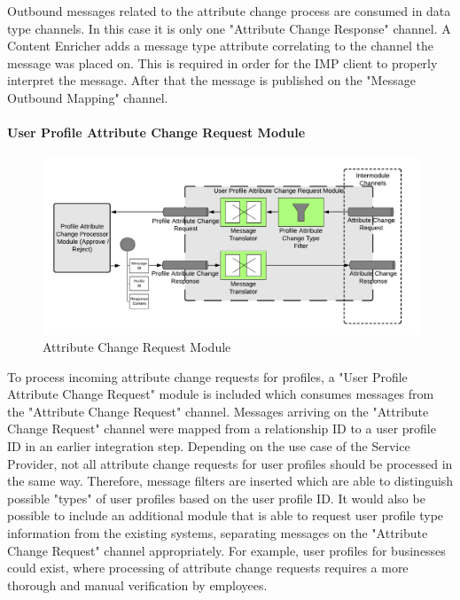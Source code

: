 Outbound messages related to the attribute change process are consumed in data type channels. In this case it is only one "Attribute Change Response" channel. A Content Enricher adds a message type attribute correlating to the channel the message was placed on. This is required in order for the IMP client to properly interpret the message. After that the message is published on the "Message Outbound Mapping" channel.

\paragraph{User Profile Attribute Change Request Module}

\begin{figure}[H]
    \centering
    \includegraphics[scale=0.6]{Diagrams/Integration Architecture 1/Technological Integration/12. Attribute Change Request Module.pdf}
    \caption{Attribute Change Request Module}
    \label{integration1:attribute_change_request_module}
\end{figure}

To process incoming attribute change requests for profiles, a "User Profile Attribute Change Request" module is included which consumes messages from the "Attribute Change Request" channel. Messages arriving on the "Attribute Change Request" channel were mapped from a relationship ID to a user profile ID in an earlier integration step. Depending on the use case of the Service Provider, not all attribute change requests for user profiles should be processed in the same way. Therefore, message filters are inserted which are able to distinguish possible "types" of user profiles based on the user profile ID. It would also be possible to include an additional module that is able to request user profile type information from the existing systems, separating messages on the "Attribute Change Request" channel appropriately. For example, user profiles for businesses could exist, where processing of attribute change requests requires a more thorough and manual verification by employees. 

